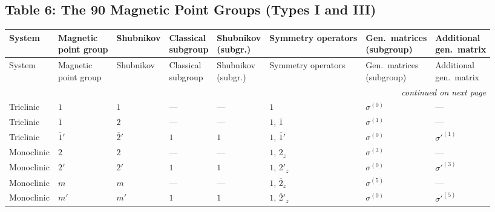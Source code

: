 \documentclass[a4paper,11pt]{article}
\newcommand{\ob}[1]{\overline{#1}}
\newcommand{\sg}[1]{\sigma^{(#1)}}
\newcommand{\sgp}[1]{\sigma'^{(#1)}}
\begin{document}
\newpage
\begin{landscape}
\section*{Table 6: The 90 Magnetic Point Groups (Types I and III)}
\label{sec:table6}
\footnotesize
\renewcommand{\arraystretch}{1.15}
\begin{longtable}{l l l l l p{9.5cm} l l}
\toprule
System & \shortstack{Magnetic\\point group} & Shubnikov & \shortstack{Classical\\subgroup} & \shortstack{Shubnikov\\(subgr.)} & Symmetry operators & \shortstack{Gen.\ matrices\\(subgroup)} & \shortstack{Additional\\gen.\ matrix} \\
\midrule
\endfirsthead
\toprule
System & \shortstack{Magnetic\\point group} & Shubnikov & \shortstack{Classical\\subgroup} & \shortstack{Shubnikov\\(subgr.)} & Symmetry operators & \shortstack{Gen.\ matrices\\(subgroup)} & \shortstack{Additional\\gen.\ matrix} \\
\midrule
\endhead
\midrule
\multicolumn{8}{r}{\footnotesize\itshape continued on next page}\\
\endfoot
\bottomrule
\endlastfoot
Triclinic & $1$ & $1$ & --- & --- & $1$ & $\sg{0}$ & --- \\
Triclinic & $\ob{1}$ & $\ob{2}$ & --- & --- & $1$, $\ob{1}$ & $\sg{1}$ & --- \\
Triclinic & $\ob{1}'$ & $\ob{2}'$ & $1$ & $1$ & $1$, $\ob{1}'$ & $\sg{0}$ & $\sgp{1}$ \\
\addlinespace
Monoclinic & $2$ & $2$ & --- & --- & $1$, $2_z$ & $\sg{3}$ & --- \\
Monoclinic & $2'$ & $2'$ & $1$ & $1$ & $1$, $2'_z$ & $\sg{0}$ & $\sgp{3}$ \\
Monoclinic & $m$ & $m$ & --- & --- & $1$, $\ob{2}_z$ & $\sg{5}$ & --- \\
Monoclinic & $m'$ & $m'$ & $1$ & $1$ & $1$, $\ob{2}'_z$ & $\sg{0}$ & $\sgp{5}$ \\

\end{longtable}
\end{landscape}
\end{document}
